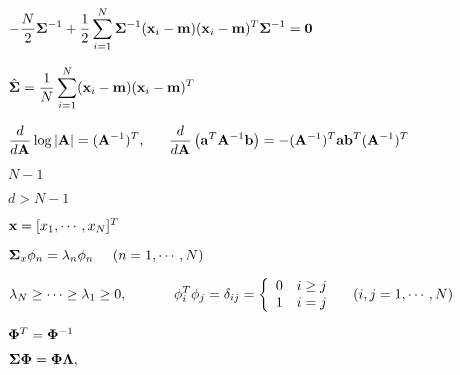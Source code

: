 \documentclass{article}
\def\lthtmlcheckvsize{\ifdim\ht\sizebox<\vsize 
  \ifdim\wd\sizebox<\hsize\expandafter\hfill\fi \expandafter\vfill
  \else\expandafter\vss\fi}%
\begin{document}
{\newpage\clearpage
{}%
$\displaystyle -\frac{N}{2}{\bf\Sigma}^{-1} +\frac{1}{2} \sum_{i=1}^N
{\bf\Sigma}^{-1}({\bf x}_i-{\bf m})({\bf x}_i-{\bf m})^T{\bf\Sigma}^{-1}
={\bf0}$%
\lthtmlindisplaymathZ
\lthtmlcheckvsize\clearpage}

{\newpage\clearpage
{}%
$\displaystyle \hat{\bf\Sigma}=\frac{1}{N} \sum_{i=1}^N ({\bf x}_i-{\bf m})({\bf x}_i-{\bf m})^T$%
\lthtmlindisplaymathZ
\lthtmlcheckvsize\clearpage}

{\newpage\clearpage
{}%
$\displaystyle \frac{d}{d{\bf A}}\log|{\bf A}|=({\bf A}^{-1})^T,
\;\;\;\;\;\;
\frac{d}{d{\bf A}} \left({\bf a}^T{\bf A}^{-1}{\bf b}\right)
=-({\bf A}^{-1})^T{\bf a}{\bf b}^T({\bf A}^{-1})^T$%
\lthtmlindisplaymathZ
\lthtmlcheckvsize\clearpage}

{\newpage\clearpage
{}%
$ N-1$%
\lthtmlindisplaymathZ
\lthtmlcheckvsize\clearpage}

{\newpage\clearpage
{}%
$ d>N-1$%
\lthtmlindisplaymathZ
\lthtmlcheckvsize\clearpage}

{\newpage\clearpage
{}%
$ {\bf x}=[x_1,\cdots,x_N]^T$%
\lthtmlindisplaymathZ
\lthtmlcheckvsize\clearpage}

{\newpage\clearpage
{}%
$\displaystyle {\bf\Sigma}_x{\bf\phi}_n=\lambda_n{\bf\phi}_n\;\;\;\;\;(n=1,\cdots,N)$%
\lthtmlindisplaymathZ
\lthtmlcheckvsize\clearpage}

{\newpage\clearpage
{}%
$\displaystyle \lambda_N\ge\cdots\ge\lambda_1\ge 0,\;\;\;\;\;\;\;\;\;\;\;\;
{\bf\phi}_i^T{\bf\phi}_j=\delta_{ij}
=\left\{\begin{array}{ll}0 & i\ge j\\1 & i=j\end{array}\right.
\;\;\;\;(i,j=1,\cdots,N)$%
\lthtmlindisplaymathZ
\lthtmlcheckvsize\clearpage}

{\newpage\clearpage
{}%
$ {\bf\Phi}^T={\bf\Phi}^{-1}$%
\lthtmlindisplaymathZ
\lthtmlcheckvsize\clearpage}

{\newpage\clearpage
{}%
$\displaystyle {\bf\Sigma}{\bf\Phi}={\bf\Phi}{\bf\Lambda},
\;\;\;\;\;$%
\lthtmlindisplaymathZ
\lthtmlcheckvsize\clearpage}
\end{document}
